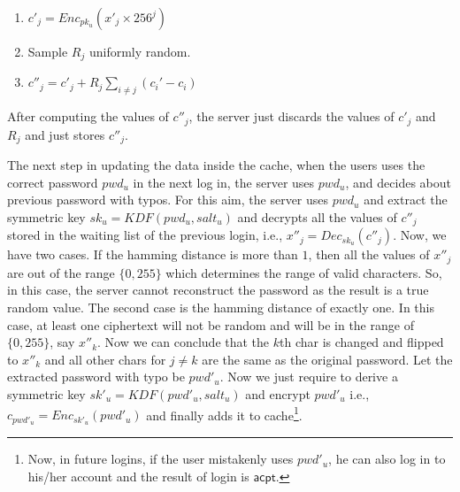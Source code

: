 \begin{itemize}
	 \begin{enumerate}
	 	\item $ c'_j = Enc_{pk_u} (x'_j \times 256^j) $
	 	\item Sample $ R_j $ uniformly random. 
	 	\item $ c''_j = c'_j + R_j\sum_{i\neq j} (c_i' - c_i) $
	 \end{enumerate}
	 After computing the values of $ c''_j $, the server just discards the values of $ c'_j $ and $ R_j $ and just stores $ c''_j $.  

	 
	 The next step in updating the data inside the cache, when the users uses the correct password $ pwd_u $ in the next log in, the server uses $ pwd_u $, and decides about previous password with typos. For this aim, the server uses $ pwd_u $ and extract the symmetric key $ sk_u = KDF(pwd_u, salt_u) $ and decrypts all the values of $ c''_j $ stored in the waiting list of the previous login, i.e., $ x''_j = Dec_{sk_u} (c''_j)$. Now, we have two cases. If the hamming distance is more than $ 1 $, then all the values of $ x''_j $ are out of the range $ \{0,255\}$ which determines the range of valid characters. So, in this case, the server cannot reconstruct the password as the result is a true random value. The second case is the hamming distance of exactly one. In this case, at least one ciphertext will not be random and will be in the range of $ \{0,255\} $, say $ x''_k $. Now we can conclude that the $ k $th char is changed and flipped to $ x''_k $ and all other chars for $ j\neq k $ are the same as the original password. Let the extracted password with typo be $ pwd'_u $. Now we just require to derive a symmetric key $ sk'_u = KDF(pwd'_u, salt_u) $ and encrypt $ pwd'_u $ i.e., $ c_{pwd'_u} = Enc_{sk'_u} (pwd'_u)$ and finally adds it to cache\footnote{Now, in future logins, if the user mistakenly uses $ pwd'_u $, he can also log in to his/her account and the result of login is $ \mathsf{acpt} $. }. 
	

\end{itemize}
